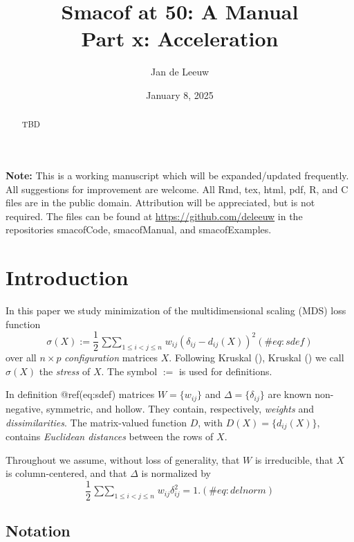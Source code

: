 \documentclass[
  12pt,
  letterpaper,
  DIV=11,
  numbers=noendperiod]{scrartcl}
\title{Smacof at 50: A Manual\\
Part x: Acceleration}
\author{Jan de Leeuw}
\date{January 8, 2025}
\renewcommand*\contentsname{Table of contents}
\newcommand\contentsname{Table of contents}
\begin{document}
\maketitle
\begin{abstract}
TBD
\end{abstract}

\renewcommand*\contentsname{Table of contents}
{
\hypersetup{linkcolor=}
\setcounter{tocdepth}{3}
\tableofcontents
}

\textbf{Note:} This is a working manuscript which will be
expanded/updated frequently. All suggestions for improvement are
welcome. All Rmd, tex, html, pdf, R, and C files are in the public
domain. Attribution will be appreciated, but is not required. The files
can be found at \url{https://github.com/deleeuw} in the repositories
smacofCode, smacofManual, and smacofExamples.

\section{Introduction}\label{introduction}

In this paper we study minimization of the multidimensional scaling
(MDS) loss function \begin{equation}
\sigma(X):=\frac12\mathop{\sum\sum}_{1\leq i<j\leq n} w_{ij}(\delta_{ij}-d_{ij}(X))^2
(\#eq:sdef)
\end{equation} over all \(n\times p\) \emph{configuration} matrices
\(X\). Following Kruskal (), Kruskal
() we call \(\sigma(X)\) the
\emph{stress} of \(X\). The symbol \(:=\) is used for definitions.

In definition @ref(eq:sdef) matrices \(W=\{w_{ij}\}\) and
\(\Delta=\{\delta_{ij}\}\) are known non-negative, symmetric, and
hollow. They contain, respectively, \emph{weights} and
\emph{dissimilarities}. The matrix-valued function \(D\), with
\(D(X)=\{d_{ij}(X)\}\), contains \emph{Euclidean distances} between the
rows of \(X\).

Throughout we assume, without loss of generality, that \(W\) is
irreducible, that \(X\) is column-centered, and that \(\Delta\) is
normalized by \begin{equation}
\frac12\mathop{\sum\sum}_{1\leq i<j\leq n} w_{ij}\delta_{ij}^2=1.
(\#eq:delnorm)
\end{equation}

\subsection{Notation}\label{notation}
\end{document}
